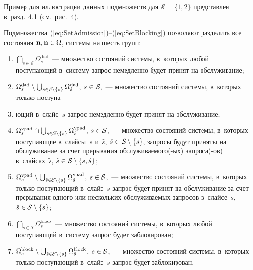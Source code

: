 \begin{multicols}{2}
Пример для иллюстрации данных подмножеств для $\mathcal{S} = 
\{1,2\}$ пред\-став\-лен в~разд.~4.1 (см.\ рис.~4).

Подмножества~(\ref{eq:SetAdmission})--(\ref{eq:SetBlocking}) позволяют разделить все состояния 
$\mathbf{n},\mathbf{n}\hm\in\Omega$, системы на шесть групп:
\begin{enumerate}[(1)]
\item $\bigcap\nolimits_{s\in\mathcal{S}}\Omega_s^{\mathrm{dad}}$~--- множество 
состояний сис\-те\-мы, в~которых любой поступающий в~систему запрос 
немедленно будет принят на обслуживание;
\item $\Omega_s^{\mathrm{dad}}\setminus 
\bigcup\nolimits_{\hat{s}\hm\in\mathcal{S}\setminus\{s\}} 
\Omega_{\hat{s}}^{\mathrm{dad}}$, $s\hm\in\mathcal{S}$,~--- множество состояний 
сис\-те\-мы, в~которых только по\-сту\-па-\linebreak\vspace*{-16pt}
\end{enumerate}

\columnbreak

\begin{enumerate}[(1)]
\setcounter{enumi}{2}
\item[\,] ющий в~слайс~$s$ запрос немедленно будет 
принят на обслуживание;
\item $\Omega_s^{\mathrm{vpad}} \cap 
\bigcup\nolimits_{\hat{s}\hm\in\mathcal{S}\setminus\{s\}} 
\Omega_{\hat{s}}^{\mathrm{vpad}}$, $s\hm\in\mathcal{S}$,~--- множество состояний 
системы, в~которых поступающие в~слайсы~$s$ и~$\hat{s}$,
$\hat{s}\hm\in\mathcal{S}\setminus\{s\}$, запросы будут приняты на 
обслуживание за счет прерывания об\-слу\-жи\-ва\-емо\-го(-ых) за\-про\-са(-ов) в~слайсах~$\tilde{s}$,
$\tilde{s}\hm\in\mathcal{S}\setminus\{s,\hat{s}\}$;
\item $\Omega_s^{\mathrm{vpad}} \setminus 
\bigcup\nolimits_{\hat{s}\hm\in\mathcal{S}\setminus\{s\}} 
\Omega_{\hat{s}}^{\mathrm{vpad}}$, $s\hm\in\mathcal{S}$,~--- множество состояний 
системы, в~которых только поступающий в~слайс~$s$ запрос будет принят на 
обслуживание за счет прерывания одного или нескольких об\-слу\-жи\-ва\-емых запросов 
в~слайсе~$\hat{s}$, $\hat{s}\hm\in\mathcal{S}\setminus\{s\}$;
\item $\bigcap\nolimits_{s\in\mathcal{S}}\Omega_s^{\mathrm{block}}$~--- множество 
состояний системы, в~которых любой поступающий в~систему запрос будет 
заблокирован;
\item $\Omega_s^{\mathrm{block}}\setminus 
\bigcup\nolimits_{\hat{s}\hm\in\mathcal{S}\setminus\{s\}} 
\Omega_{\hat{s}}^{\mathrm{block}}$, $s\hm\in\mathcal{S}$,~--- множество состояний 
системы, в~которых только поступающий в~слайс~$s$ запрос будет 
заблокирован.
\end{enumerate}



\end{multicols}
